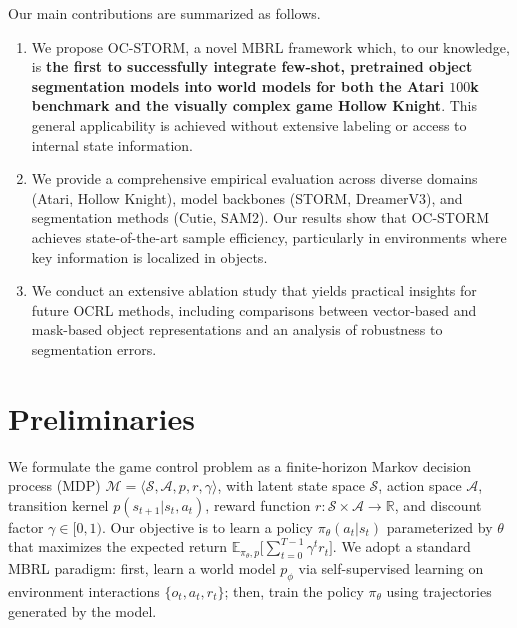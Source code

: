 \documentclass{article} %
\begin{document}
Our main contributions are summarized as follows.
\begin{enumerate}
    \item[c1)] 
    We propose OC-STORM, a novel MBRL framework which, to our knowledge, is \textbf{the first to successfully integrate few-shot, pretrained object segmentation models into world models for both the Atari $100$k benchmark and the visually complex game Hollow Knight}. This general applicability is achieved without extensive labeling or access to internal state information.
    \item[c2)] We provide a comprehensive empirical evaluation across diverse domains (Atari, Hollow Knight), model backbones (STORM, DreamerV3), and segmentation methods (Cutie, SAM2). Our results show that OC-STORM achieves state-of-the-art sample efficiency, particularly in environments where key information is localized in objects.
    \item[c3)] We conduct an extensive ablation study that yields practical insights for future OCRL methods, including comparisons between vector-based and mask-based object representations and an analysis of robustness to segmentation errors.
\end{enumerate}

\section{Preliminaries}
We formulate the game control problem as a finite-horizon Markov decision process (MDP) $\mathcal{M} = \langle \mathcal{S},\mathcal{A},p,r,\gamma\rangle$, with latent state space $\mathcal{S}$, action space $\mathcal{A}$, transition kernel $p(s_{t+1}| s_t,a_t)$, reward function $r:\mathcal{S}\times\mathcal{A}\to\mathbb{R}$, and discount factor $\gamma\in[0,1)$. Our objective is to learn a policy $\pi_\theta(a_t | s_t)$ parameterized by $\theta$ that maximizes the expected return $\mathbb{E}_{\pi_\theta,p} \big[ \sum_{t=0}^{T-1}\gamma^t r_t \big]$. We adopt a standard MBRL paradigm: first, learn a world model $p_\phi$ via self-supervised learning on environment interactions $\{o_t, a_t, r_t\}$; then, train the policy $\pi_\theta$ using trajectories generated by the model.
\end{document}
